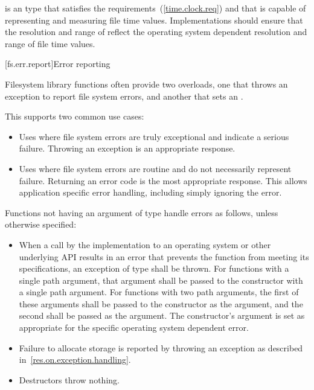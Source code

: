 \pnum
{} is an  type
that satisfies the  requirements~(\ref{time.clock.req})
and that is capable of representing and measuring file time values.
Implementations should ensure that the resolution and range of
 reflect the operating system dependent resolution and range
of file time values.

[fs.err.report]{Error reporting}

\pnum
Filesystem library functions often provide two overloads, one that
throws an exception to report file system errors, and another that sets an .
\begin{note} This supports two common use cases:
\begin{itemize}
\item
Uses where file system errors are truly exceptional
and indicate a serious failure.
Throwing an exception is an appropriate response.
\item
Uses where file system errors are routine
and do not necessarily represent failure.
Returning an error code is the most appropriate response.
This allows application specific error handling, including simply ignoring the error.
\end{itemize}
\end{note}

\pnum
Functions not having an argument of type 
handle errors as follows, unless otherwise specified:
\begin{itemize}
\item When a call by the
  implementation to an operating system or other underlying API results in an
  error that prevents the function from meeting its specifications, an exception
  of type
 shall be thrown. For functions with a single path
  argument, that argument shall be passed to the
 constructor with a single path argument. For
  functions with two path arguments, the first of these arguments shall be
  passed to the
 constructor as the  argument,
  and the second shall be passed as the  argument. The
   constructor's  argument
  is set as appropriate for the specific operating system dependent error.
\item Failure to allocate storage is reported by throwing an exception
as described in~\ref{res.on.exception.handling}.
\item Destructors throw nothing.
\end{itemize}


